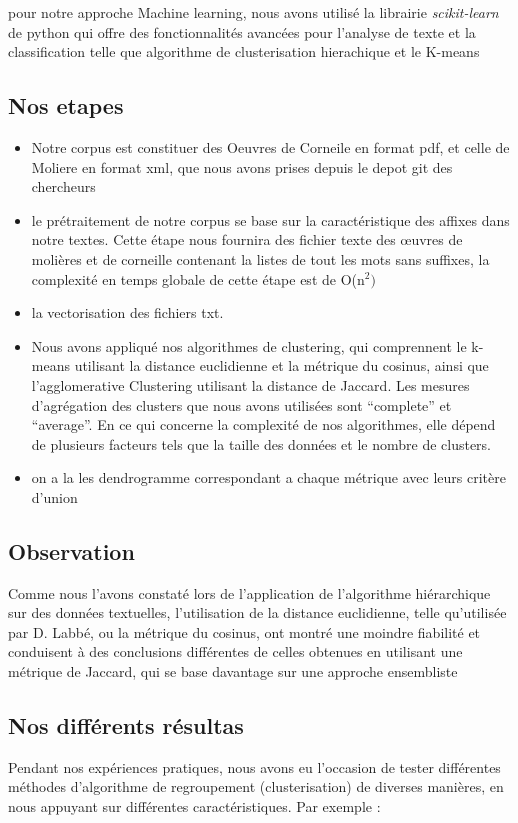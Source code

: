 \documentclass[]{report}
\begin{document}
pour notre approche Machine learning, nous avons utilisé la librairie \textit{scikit-learn} de python qui offre des fonctionnalités avancées pour l'analyse
de texte et la classification telle que algorithme de clusterisation hierachique et le K-means 
\subsection{Nos etapes } 

\begin{itemize}
	\item Notre corpus est constituer des Oeuvres de Corneile en format pdf, et celle de Moliere  en format xml, que nous avons prises depuis le depot git des chercheurs 
	 \item le prétraitement de notre corpus se base sur la caractéristique des affixes dans notre textes. Cette étape nous fournira des fichier texte des œuvres de molières et de corneille contenant la listes de tout les mots sans suffixes, la complexité en temps globale de cette étape est de O(n\(^2)\)
	 \item la vectorisation des fichiers txt.
	 \item Nous avons appliqué nos algorithmes de clustering, qui comprennent le k-means utilisant la distance euclidienne et la métrique du cosinus, ainsi que l'agglomerative Clustering utilisant la distance de Jaccard. Les mesures d'agrégation des clusters que nous avons utilisées sont ``complete'' et ``average''. En ce qui concerne la complexité de nos algorithmes, elle dépend de plusieurs facteurs tels que la taille des données et le nombre de clusters. 
	  \item  on a la les dendrogramme correspondant a chaque métrique avec leurs critère d'union
\end{itemize}

\subsection{Observation}
 Comme nous l'avons constaté lors de l'application de l'algorithme hiérarchique sur des données textuelles, l'utilisation de la distance euclidienne, telle qu'utilisée par D. Labbé, ou la métrique du cosinus, ont montré une moindre fiabilité et conduisent à des conclusions différentes de celles obtenues en utilisant une métrique de Jaccard, qui se base davantage sur une approche ensembliste 

\subsection{Nos différents résultas}
Pendant nos expériences pratiques, nous avons eu l'occasion de tester différentes méthodes d'algorithme de regroupement (clusterisation) de diverses manières, en nous appuyant sur différentes caractéristiques. Par exemple :
\end{document}
